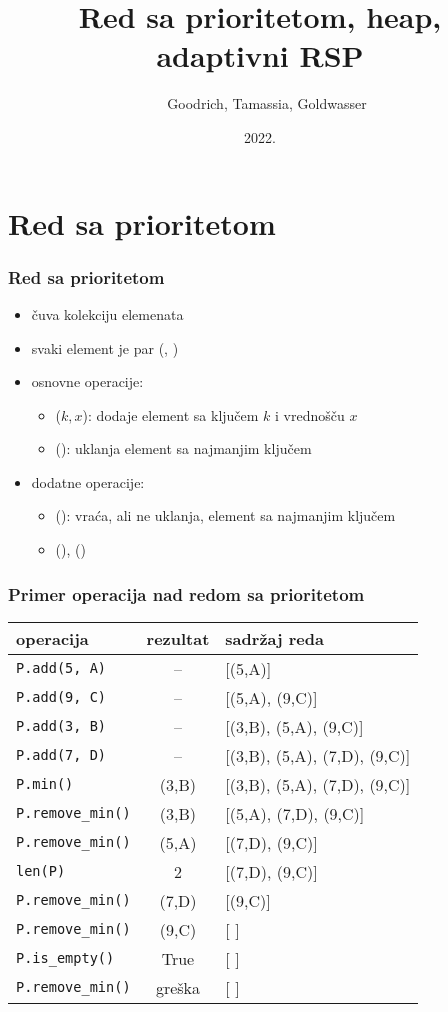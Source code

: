 \documentclass[compress,aspectratio=169]{beamer}
\title{Red sa prioritetom, heap, adaptivni RSP}
\author{\textcopyright \ \ Goodrich, Tamassia, Goldwasser}
\institute{Katedra za informatiku, Fakultet tehničkih nauka, Univerzitet u
Novom Sadu}
\date{2022.}
\begin{document}
\frame{\titlepage}

\section[Red sa prioritetom]{Red sa prioritetom}
\begin{frame}[fragile]
  \frametitle{Red sa prioritetom}
  \begin{itemize}
    \item {} čuva kolekciju elemenata 
    \item svaki element je par (, )
    \item osnovne operacije:
    \begin{itemize}
      \item {}($k, x$): dodaje element sa ključem $k$ i vrednošču $x$
      \item {}(): uklanja element sa najmanjim ključem 
    \end{itemize}
    \item dodatne operacije:
    \begin{itemize}
      \item {}(): vraća, ali ne uklanja, element sa najmanjim ključem
      \item {}(), () 
    \end{itemize}
  \end{itemize}
\end{frame}

\begin{frame}[fragile,shrink=10]
  \frametitle{Primer operacija nad redom sa prioritetom}
\begin{center}
\begin{tabular}{lcl}
\textbf{operacija} & \textbf{rezultat} & \textbf{sadržaj reda} \\
\hline \hline
\texttt{P.add(5, A)} & -- & [(5,A)] \\ 
\texttt{P.add(9, C)} & -- & [(5,A), (9,C)] \\ 
\texttt{P.add(3, B)} & -- & [(3,B), (5,A), (9,C)] \\ 
\texttt{P.add(7, D)} & -- & [(3,B), (5,A), (7,D), (9,C)] \\ 
\texttt{P.min()} & (3,B) & [(3,B), (5,A), (7,D), (9,C)] \\ 
\texttt{P.remove\_min()} & (3,B) & [(5,A), (7,D), (9,C)] \\ 
\texttt{P.remove\_min()} & (5,A) & [(7,D), (9,C)] \\ 
\texttt{len(P)} & 2 & [(7,D), (9,C)] \\
\texttt{P.remove\_min()} & (7,D) & [(9,C)] \\ 
\texttt{P.remove\_min()} & (9,C) & [ ] \\ 
\texttt{P.is\_empty()} & True & [ ] \\ 
\texttt{P.remove\_min()} & greška & [ ]
\end{tabular}
\end{center}
\end{frame}
\end{document}

